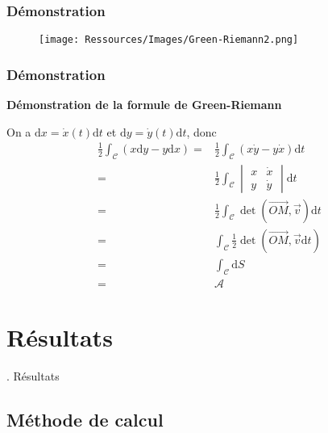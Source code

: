\documentclass[french]{beamer}
\begin{document}
\begin{frame}
  \frametitle{Démonstration}
  
  \begin{figure}
    \texttt{[image: Ressources/Images/Green-Riemann2.png]}
  \end{figure}
  
\end{frame}

\begin{frame}
  \frametitle{Démonstration}

  \textbf{Démonstration de la formule de Green-Riemann}
  
  On a $\mathrm{d}x = \dot x(t) \mathrm{d}t$ et $\mathrm{d}y = \dot y(t) \mathrm{d}t$, donc
  \begin{align*}
    \frac{1}{2} \int_{\mathcal{C}}(x \mathrm{d}y - y \mathrm{d}x)
    = & \frac{1}{2} \int_{\mathcal{C}}(x \dot y - y \dot x) \mathrm{d}t \\
    = & \frac{1}{2} \int_{\mathcal{C}}
    \begin{vmatrix}
      x & \dot x \\
      y & \dot y
    \end{vmatrix} \mathrm{d}t \\
    = & \frac{1}{2} \int_{\mathcal{C}} \det(\overrightarrow{OM},\overrightarrow{v}) \mathrm{d}t \\
    = & \int_{\mathcal{C}} \frac{1}{2} \det(\overrightarrow{OM},\overrightarrow{v} \mathrm{d}t) \\
    = & \int_{\mathcal{C}} \mathrm{d}S \\
    = & \mathcal{A}
  \end{align*}
  
\end{frame}

\section{Résultats}

\begin{frame}
  \center \LARGE \thesection. Résultats
\end{frame}

\subsection{Méthode de calcul}
\end{document}
